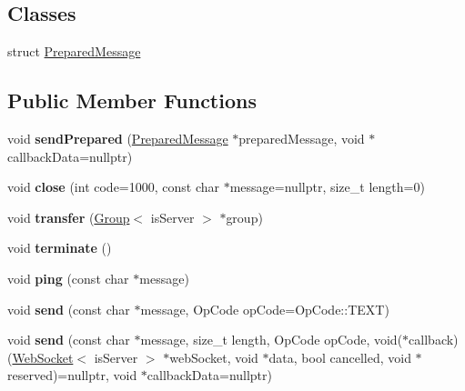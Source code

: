 \subsection*{Classes}
\begin{DoxyCompactItemize}
\item 
struct \mbox{\hyperlink{structu_w_s_1_1_web_socket_1_1_prepared_message}{Prepared\+Message}}
\end{DoxyCompactItemize}
\subsection*{Public Member Functions}
\begin{DoxyCompactItemize}
\item 
\mbox{\label{structu_w_s_1_1_web_socket_a4fa18c2eb79a51f5059156d4671addb4}} 
void {\bfseries send\+Prepared} (\mbox{\hyperlink{structu_w_s_1_1_web_socket_1_1_prepared_message}{Prepared\+Message}} $\ast$prepared\+Message, void $\ast$callback\+Data=nullptr)
\item 
\mbox{\label{structu_w_s_1_1_web_socket_aadbc54e4cbf356b2f5108a04aac59565}} 
void {\bfseries close} (int code=1000, const char $\ast$message=nullptr, size\+\_\+t length=0)
\item 
\mbox{\label{structu_w_s_1_1_web_socket_ae0b13c1510caf30553aa5acb91642ec0}} 
void {\bfseries transfer} (\mbox{\hyperlink{structu_w_s_1_1_group}{Group}}$<$ is\+Server $>$ $\ast$group)
\item 
\mbox{\label{structu_w_s_1_1_web_socket_aaac83d1bb89b4b88adc38405b7cd2235}} 
void {\bfseries terminate} ()
\item 
\mbox{\label{structu_w_s_1_1_web_socket_a12879c4cd8fcff77d902f051f4cbbcab}} 
void {\bfseries ping} (const char $\ast$message)
\item 
\mbox{\label{structu_w_s_1_1_web_socket_aa39139f5c8fcdc1f5cd31261060e4a16}} 
void {\bfseries send} (const char $\ast$message, Op\+Code op\+Code=Op\+Code\+::\+T\+E\+XT)
\item 
\mbox{\label{structu_w_s_1_1_web_socket_a5d647cc961468a19e03f5402bc8fe292}} 
void {\bfseries send} (const char $\ast$message, size\+\_\+t length, Op\+Code op\+Code, void($\ast$callback)(\mbox{\hyperlink{structu_w_s_1_1_web_socket}{Web\+Socket}}$<$ is\+Server $>$ $\ast$web\+Socket, void $\ast$data, bool cancelled, void $\ast$reserved)=nullptr, void $\ast$callback\+Data=nullptr)
\end{DoxyCompactItemize}
